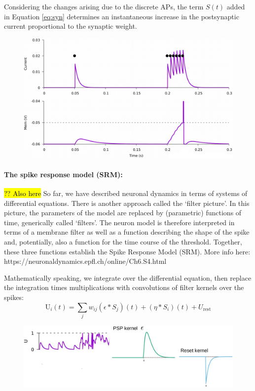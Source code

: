 \documentclass[main]{subfiles}
\begin{document}
Considering the changes arising due to the discrete APs, the term $S(t)$ added in Equation \ref{eq:syn} determines an instantaneous increase in the postsynaptic current proportional to the synaptic weight.

\begin{figure}[H]
    \centering
    \includegraphics[width=0.55\linewidth]{10_DeepLearningWithSpikes/figures/exp_ps_current.png}
    \caption{}
    \label{fig:my_label}
\end{figure}
%
\paragraph{The spike response model (SRM):}
\hl{?? Also here} 
So far, we have described neuronal dynamics in terms of systems of differential equations. There is another approach called the ‘filter picture’. In this picture, the parameters of the model are replaced by (parametric) functions of time, generically called ‘filters’. The neuron model is therefore interpreted in terms of a membrane filter as well as a function describing the shape of the spike and, potentially, also a function for the time course of the threshold. Together, these three functions establish the Spike Response Model (SRM). More info here: https://neuronaldynamics.epfl.ch/online/Ch6.S4.html

Mathematically speaking, we integrate over the differential equation, then replace the integration times multiplications with convolutions of filter kernels over the spikes:
%
\begin{equation}
\mathrm{U}_{i}(t)=\sum_{j} w_{i j}\left(\epsilon * S_{j}\right)(t)+\left(\eta * S_{i}\right)(t)+U_{\mathrm{rest}}
\end{equation}
%
\begin{figure}[H]
    \centering
    \includegraphics[width=0.7\linewidth]{10_DeepLearningWithSpikes/figures/spike_response_model.png}
    \caption{}
    \label{fig:my_label}
\end{figure}
%
\end{document}
